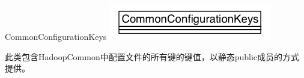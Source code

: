 \begin{XeClass}{CommonConfigurationKeys}
\includegraphics[width=\textwidth]{cdig/CommonConfigurationKeys.png}
     
 此类包含HadoopCommon中配置文件的所有键的键值，以静态public成员的方式提供。

\end{XeClass}

